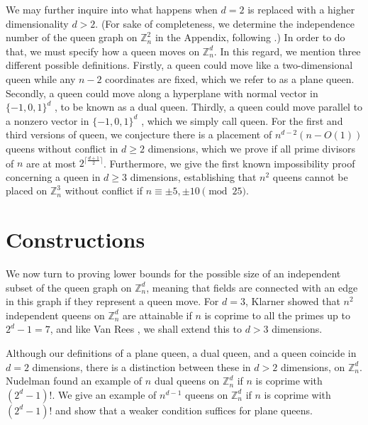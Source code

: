 \documentclass[11pt]{article}
\begin{document}
We may further inquire into what happens when $d=2$ is replaced with a higher dimensionality $d>2$. (For sake of completeness, we determine the independence number of the queen graph on $\mathbb{Z}_n^2$ in the Appendix, following \cite{Mon}.) In order to do that, we must specify how a queen moves on $\mathbb{Z}_n^d$. In this regard, we mention three different possible definitions. Firstly, a queen could move like a two-dimensional queen while any $n-2$ coordinates are fixed, which we refer to as a plane queen. Secondly, a queen could move along a hyperplane with normal vector in $\{-1,0,1\}^d$ \cite{Nud}, to be known as a dual queen. Thirdly, a queen could move parallel to a nonzero vector in $\{-1,0,1\}^d$ \cite{BeS}, which we simply call queen. For the first and third versions of queen, we conjecture there is a placement of $n^{d-2}(n-O(1))$ queens without conflict in $d\ge 2$ dimensions, which we prove if all prime divisors of $n$ are at most $2^{\lceil \frac{d+1}{2}\rceil}$. Furthermore, we give the first known impossibility proof concerning a queen in $d\ge 3$ dimensions, establishing that $n^2$ queens cannot be placed on $\mathbb{Z}_n^3$ without conflict if $n\equiv \pm 5,\pm 10\pmod{25}$.

\section{Constructions}

We now turn to proving lower bounds for the possible size of an independent subset of the queen graph on $\mathbb{Z}_n^d$, meaning that fields are connected with an edge in this graph if they represent a queen move. For $d=3$, Klarner \cite{Kla} showed that $n^2$ independent queens on $\mathbb{Z}_n^d$ are attainable if $n$ is coprime to all the primes up to $2^d-1=7$, and like Van Rees \cite{VaR}, we shall extend this to $d>3$ dimensions. %



Although our definitions of a plane queen, a dual queen, and a queen coincide in $d=2$ dimensions, there is a distinction between these in $d>2$ dimensions, on $\mathbb{Z}_n^d$. Nudelman \cite{Nud} found an example of $n$ dual queens on $\mathbb{Z}_n^d$ if $n$ is coprime with $(2^d-1)!$. We give an example of $n^{d-1}$ queens on $\mathbb{Z}_n^d$ if $n$ is coprime with $(2^d-1)!$ and show that a weaker condition suffices for plane queens.
\end{document}
